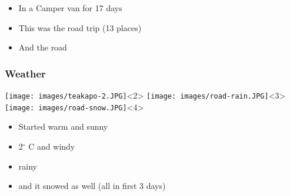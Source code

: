 \documentclass[12pt]{beamer}
\begin{document}
\begin{frame}
                \begin{itemize}
                    \item In a Camper van for 17 days
                    \pause
                    \item This was the road trip (13 places)
                    \pause
                    \item And the road
                \end{itemize}
        \end{frame}

        \begin{frame}
            \frametitle{Weather}
                \begin{center}
                    \texttt{[image: images/teakapo-2.JPG]}<2>
                    \texttt{[image: images/road-rain.JPG]}<3>
                    \texttt{[image: images/road-snow.JPG]}<4>
                \end{center}
            
                \begin{itemize}
                    \item Started warm and sunny
                    \pause
                    \item 2$^\circ$ C and windy
                    \pause
                    \item rainy
                    \pause
                    \item and it snowed as well (all in first 3 days)
                \end{itemize}
        \end{frame}
\end{document}

